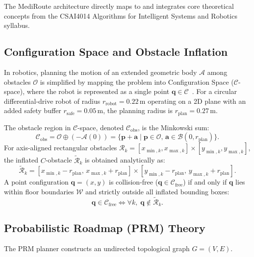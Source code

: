 \documentclass[12pt,a4paper]{article}
\begin{document}
The MediRoute architecture directly maps to and integrates core theoretical concepts from the CSAI4014 Algorithms for Intelligent Systems and Robotics syllabus.

\subsection{Configuration Space and Obstacle Inflation}
In robotics, planning the motion of an extended geometric body $\mathcal{A}$ among obstacles $\mathcal{O}$ is simplified by mapping the problem into Configuration Space ($\mathcal{C}$-space), where the robot is represented as a single point $\mathbf{q} \in \mathcal{C}$~\cite{lavalle2006}. For a circular differential-drive robot of radius $r_{\text{robot}} = 0.22\,\text{m}$ operating on a 2D plane with an added safety buffer $r_{\text{safe}} = 0.05\,\text{m}$, the planning radius is $r_{\text{plan}} = 0.27\,\text{m}$.

The obstacle region in $\mathcal{C}$-space, denoted $\mathcal{C}_{\text{obs}}$, is the Minkowski sum:
\begin{equation}
\mathcal{C}_{\text{obs}} = \mathcal{O} \oplus (-\mathcal{A}(0)) = \{ \mathbf{p} + \mathbf{a} \mid \mathbf{p} \in \mathcal{O}, \, \mathbf{a} \in \mathcal{B}(0, r_{\text{plan}}) \}.
\end{equation}
For axis-aligned rectangular obstacles $\mathcal{R}_k = [x_{\min,k}, x_{\max,k}] \times [y_{\min,k}, y_{\max,k}]$, the inflated $C$-obstacle $\tilde{\mathcal{R}}_k$ is obtained analytically as:
\begin{equation}
\tilde{\mathcal{R}}_k = [x_{\min,k} - r_{\text{plan}}, \, x_{\max,k} + r_{\text{plan}}] \times [y_{\min,k} - r_{\text{plan}}, \, y_{\max,k} + r_{\text{plan}}].
\end{equation}
A point configuration $\mathbf{q} = (x, y)$ is collision-free ($\mathbf{q} \in \mathcal{C}_{\text{free}}$) if and only if $\mathbf{q}$ lies within floor boundaries $\mathcal{W}$ and strictly outside all inflated bounding boxes:
\begin{equation}
\mathbf{q} \in \mathcal{C}_{\text{free}} \iff \forall k, \; \mathbf{q} \notin \tilde{\mathcal{R}}_k.
\end{equation}

\subsection{Probabilistic Roadmap (PRM) Theory}
The PRM planner constructs an undirected topological graph $G = (V, E)$. 
\end{document}
